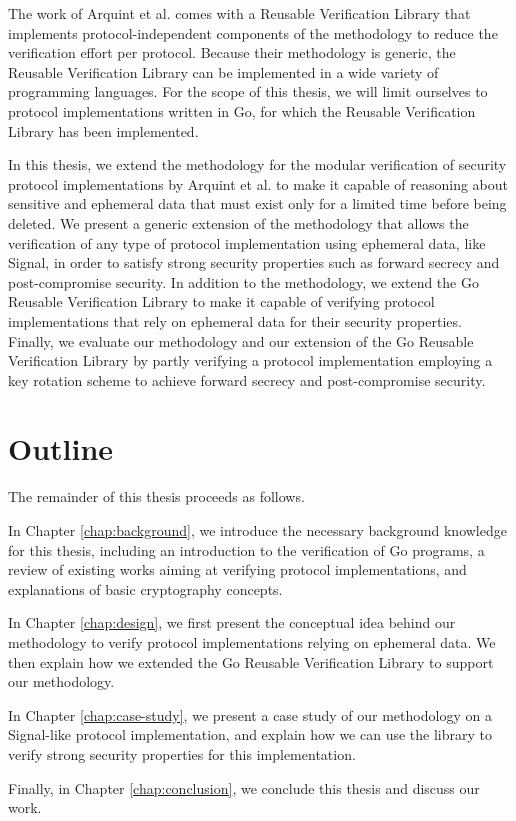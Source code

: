The work of Arquint et al. comes with a Reusable Verification Library that implements protocol-independent components of the methodology to reduce the verification effort per protocol.
Because their methodology is generic, the Reusable Verification Library can be implemented in a wide variety of programming languages.
For the scope of this thesis, we will limit ourselves to protocol implementations written in Go, for which the Reusable Verification Library has been implemented.

In this thesis, we extend the methodology for the modular verification of security protocol implementations by Arquint et al. to make it capable of reasoning about sensitive and ephemeral data that must exist only for a limited time before being deleted.
We present a generic extension of the methodology that allows the verification of any type of protocol implementation using ephemeral data, like Signal, in order to satisfy strong security properties such as forward secrecy and post-compromise security.
In addition to the methodology, we extend the Go Reusable Verification Library to make it capable of verifying protocol implementations that rely on ephemeral data for their security properties.
Finally, we evaluate our methodology and our extension of the Go Reusable Verification Library by partly verifying a protocol implementation employing a key rotation scheme to achieve forward secrecy and post-compromise security.


\section{Outline}
\label{sec:outline}

The remainder of this thesis proceeds as follows.

In Chapter \ref{chap:background}, we introduce the necessary background knowledge for this thesis, including an introduction to the verification of Go programs, a review of existing works aiming at verifying protocol implementations, and explanations of basic cryptography concepts.

In Chapter \ref{chap:design}, we first present the conceptual idea behind our methodology to verify protocol implementations relying on ephemeral data. We then explain how we extended the Go Reusable Verification Library to support our methodology.

In Chapter \ref{chap:case-study}, we present a case study of our methodology on a Signal-like protocol implementation, and explain how we can use the library to verify strong security properties for this implementation.

Finally, in Chapter \ref{chap:conclusion}, we conclude this thesis and discuss our work.
